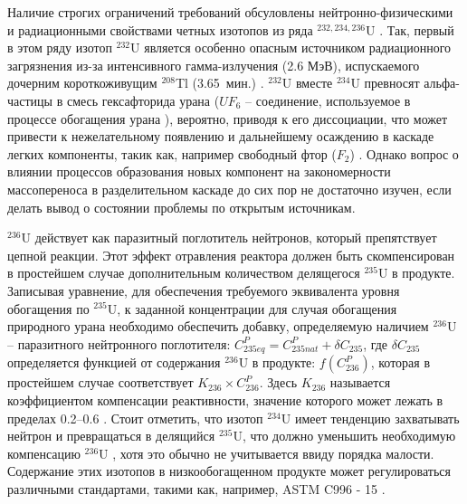 Наличие строгих ограничений требований обсуловлены нейтронно-физическими и радиационными свойствами четных изотопов из ряда $^{232,234,236}$U \cite{smirnovEvolutionIsotopicComposition2012, proselkovAnalizVozmozhnostiIspolzovaniya2003, dudnikovInfluence236UEfficacy2016}. Так, первый в этом ряду изотоп $^{232}$U является особенно опасным источником радиационного загрязнения из-за интенсивного гамма-излучения (2.6 МэВ), испускаемого дочерним короткоживущим $^{208}$Tl (3.65 мин.) \cite{matveevUran232EgoVliyanie1985,article}.
$^{232}$U вместе $^{234}$U превносят альфа-частицы в смесь гексафторида урана ($UF_6$ -- соединение, используемое в процессе обогащения урана \cite{orlovWayObtainUranium2015, orlovDesublimationPurificationTransporting2017}), вероятно, приводя к его диссоциации, что может привести к нежелательному появлению и дальнейшему осаждению в каскаде легких компоненты, такик как, например свободный фтор ($F_2$) \cite{kryuchkovObogashchennyyUranDobavleniem2007, bernhardtRadiationEffectsAlpha1958, shmelevRazrabotkaRaschetnoyModeli2012}. Однако вопрос о влиянии процессов образования новых компонент на закономерности массопереноса в разделительном каскаде до сих пор не достаточно изучен, если делать вывод о состоянии проблемы по открытым источникам.

$^{236}$U действует как паразитный поглотитель нейтронов, который препятствует цепной реакции. Этот эффект отравления реактора должен быть скомпенсирован в простейшем случае дополнительным количеством делящегося $^{235}$U в продукте. Записывая уравнение, для обеспечения требуемого эквивалента уровня обогащения по $^{235}$U, к заданной концентрации для случая обогащения природного урана необходимо обеспечить добавку, определяемую наличием $^{236}$U -- паразитного нейтронного поглотителя:
$C_{235 e q}^{P}=C_{235 n a t}^{P}+\delta C_{235}$, где $\delta C_{235}$ определяется функцией от содержания $^{236}$U в продукте:
$f\left(C_{236}^{P}\right)$, которая в простейшем случае соответствует $K_{236} \times C_{236}^{P}$. Здесь $K_{236}$ называется коэффициентом компенсации реактивности, значение которого может лежать в пределах 0.2--0.6 \cite{delagarzaMulticomponentIsotopeSeparation1961, delculAnalysisReuseUranium2009}. Стоит отметить, что изотоп $^{234}$U имеет тенденцию захватывать нейтрон и превращаться в делящийся $^{235}$U, что должно уменьшить необходимую компенсацию $^{236}$U \cite{dyachenkoIspolzovanieRegenerirovannogoUrana2012}, хотя это обычно не учитывается ввиду порядка малости. Содержание этих изотопов в низкообогащенном продукте может регулироваться различными стандартами, такими как, например, ASTM C996 - 15 \cite{c26committeeSpecificationUraniumHexafluoride}.

